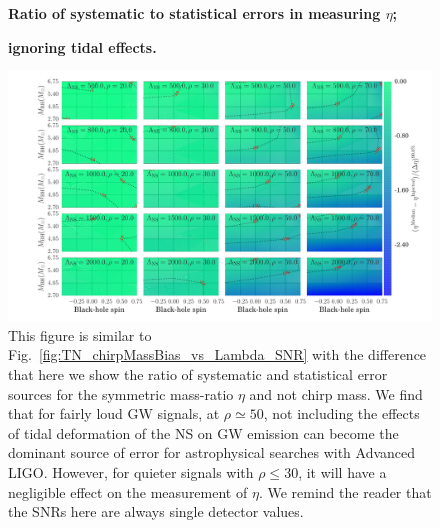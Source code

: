 \documentclass[aps,prd,amsmath,floats,floatfix, twocolumn,
superscriptaddress,nofootinbib,showpacs]{revtex4-1}
\begin{document}
%
\begin{figure}[!t]
\centering
\textbf{Ratio of systematic to statistical errors in measuring $\eta$;}\par
\textbf{ignoring tidal effects.}\par\medskip
\includegraphics[width=2\columnwidth]{plots/TNEtaBiasesOverCIWidths_CI90_0_Lambda_SNR20_70_linear}
\caption{This figure is similar to Fig.~\ref{fig:TN_chirpMassBias_vs_Lambda_SNR}
with the difference that here we show the ratio of systematic and statistical
error sources for the symmetric mass-ratio $\eta$ and not chirp mass. We find
that for fairly loud GW signals, at $\rho\simeq 50$, not including the
effects of tidal deformation of the NS on GW emission can become the dominant
source of error for astrophysical searches with Advanced LIGO. However, for
quieter signals with $\rho\leq 30$, it will have a negligible effect on the
measurement of $\eta$. We remind the reader that the SNRs here are always
single detector values.
}
\label{fig:TN_EtaBias_vs_Lambda_SNR}
\end{figure}
% 
% 
\end{document}
